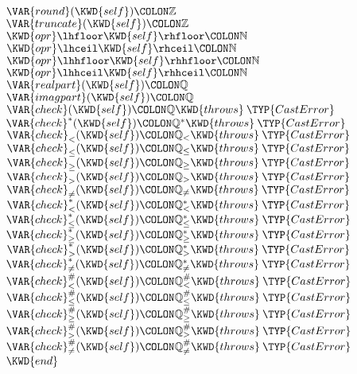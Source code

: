 \begin{Fortress}
\(  \VAR{round}(\KWD{self})\COLON \mathbb{Z}\)\\
\(  \VAR{truncate}(\KWD{self})\COLON \mathbb{Z}\)\\
\(  \KWD{opr} \lhfloor \mathord{\KWD{self}} \rhfloor\COLON \mathbb{N}\)\\
\(  \KWD{opr} \lhceil \mathord{\KWD{self}} \rhceil\COLON \mathbb{N}\)\\
\(  \KWD{opr} \lhhfloor \mathord{\KWD{self}} \rhhfloor\COLON \mathbb{N}\)\\
\(  \KWD{opr} \lhhceil \mathord{\KWD{self}} \rhhceil\COLON \mathbb{N}\)\\
\(  \VAR{realpart}(\KWD{self})\COLON \mathbb{Q}\)\\
\(  \VAR{imagpart}(\KWD{self})\COLON \mathbb{Q}\)\\
\(  \VAR{check}(\KWD{self})\COLON \mathbb{Q} \KWD{throws}\:\TYP{CastError}\)\\
\(  \VAR{check}^*(\KWD{self})\COLON \mathbb{Q}^* \KWD{throws}\:\TYP{CastError}\)\\
\(  \VAR{check}_{<}(\KWD{self})\COLON \mathbb{Q}_{<} \KWD{throws}\:\TYP{CastError}\)\\
\(  \VAR{check}_{\leq}(\KWD{self})\COLON \mathbb{Q}_{\leq} \KWD{throws}\:\TYP{CastError}\)\\
\(  \VAR{check}_{\geq}(\KWD{self})\COLON \mathbb{Q}_{\geq} \KWD{throws}\:\TYP{CastError}\)\\
\(  \VAR{check}_{>}(\KWD{self})\COLON \mathbb{Q}_{>} \KWD{throws}\:\TYP{CastError}\)\\
\(  \VAR{check}_{\neq}(\KWD{self})\COLON \mathbb{Q}_{\neq} \KWD{throws}\:\TYP{CastError}\)\\
\(  \VAR{check}^*_{<}(\KWD{self})\COLON \mathbb{Q}^*_{<} \KWD{throws}\:\TYP{CastError}\)\\
\(  \VAR{check}^*_{\leq}(\KWD{self})\COLON \mathbb{Q}^*_{\leq} \KWD{throws}\:\TYP{CastError}\)\\
\(  \VAR{check}^*_{\geq}(\KWD{self})\COLON \mathbb{Q}^*_{\geq} \KWD{throws}\:\TYP{CastError}\)\\
\(  \VAR{check}^*_{>}(\KWD{self})\COLON \mathbb{Q}^*_{>} \KWD{throws}\:\TYP{CastError}\)\\
\(  \VAR{check}^*_{\neq}(\KWD{self})\COLON \mathbb{Q}^*_{\neq} \KWD{throws}\:\TYP{CastError}\)\\
\(  \VAR{check}^{\#}_{<}(\KWD{self})\COLON \mathbb{Q}^{\#}_{<} \KWD{throws}\:\TYP{CastError}\)\\
\(  \VAR{check}^{\#}_{\leq}(\KWD{self})\COLON \mathbb{Q}^{\#}_{\leq} \KWD{throws}\:\TYP{CastError}\)\\
\(  \VAR{check}^{\#}_{\geq}(\KWD{self})\COLON \mathbb{Q}^{\#}_{\geq} \KWD{throws}\:\TYP{CastError}\)\\
\(  \VAR{check}^{\#}_{>}(\KWD{self})\COLON \mathbb{Q}^{\#}_{>} \KWD{throws}\:\TYP{CastError}\)\\
\(  \VAR{check}^{\#}_{\neq}(\KWD{self})\COLON \mathbb{Q}^{\#}_{\neq} \KWD{throws}\:\TYP{CastError}\)\-\\\poptabs
\(\KWD{end}\)
\end{Fortress}


